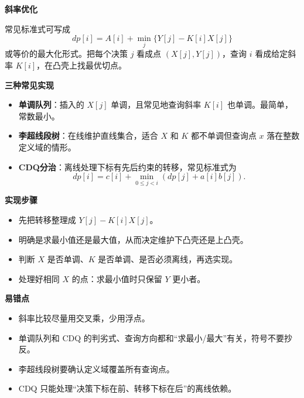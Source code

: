 \textbf{斜率优化}

常见标准式可写成
\[
dp[i]=A[i]+\min_j \{Y[j]-K[i]X[j]\}
\]
或等价的最大化形式。把每个决策 $j$ 看成点 $(X[j],Y[j])$，查询 $i$ 看成给定斜率 $K[i]$，在凸壳上找最优切点。

\textbf{三种常见实现}

\begin{itemize}
	\item \textbf{单调队列}：插入的 $X[j]$ 单调，且常见地查询斜率 $K[i]$ 也单调。最简单，常数最小。
	\item \textbf{李超线段树}：在线维护直线集合，适合 $X$ 和 $K$ 都不单调但查询点 $x$ 落在整数定义域的情形。
	\item \textbf{CDQ分治}：离线处理下标有先后约束的转移，常见标准式为
	\[
	dp[i]=c[i]+\min_{0\le j<i}(dp[j]+a[i]b[j]).
	\]
\end{itemize}

\textbf{实现步骤}

\begin{itemize}
	\item 先把转移整理成 $Y[j]-K[i]X[j]$。
	\item 明确是求最小值还是最大值，从而决定维护下凸壳还是上凸壳。
	\item 判断 $X$ 是否单调、$K$ 是否单调、是否必须离线，再选实现。
	\item 处理好相同 $X$ 的点：求最小值时只保留 $Y$ 更小者。
\end{itemize}

\textbf{易错点}

\begin{itemize}
	\item 斜率比较尽量用交叉乘，少用浮点。
	\item 单调队列和 CDQ 的判劣式、查询方向都和“求最小/最大”有关，符号不要抄反。
	\item 李超线段树要确认定义域覆盖所有查询点。
	\item CDQ 只能处理“决策下标在前、转移下标在后”的离线依赖。
\end{itemize}
